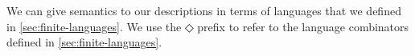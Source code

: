 We can give semantics to our descriptions in terms of languages that we defined in \cref{sec:finite-languages}. We use the ◇ prefix to refer to the language combinators defined in \cref{sec:finite-languages}.
%
\begin{code}%
%
\>[4]\AgdaSpace{}%
\AgdaSymbol{:}\AgdaSpace{}%
\AgdaSpace{}%
\AgdaSpace{}%
\AgdaSpace{}%
\AgdaSpace{}%
\<%
\\
%
\>[4]\AgdaSpace{}%
\AgdaSpace{}%
%
\>[22]\AgdaSymbol{\AgdaUnderscore{}}\AgdaSpace{}%
\AgdaSymbol{=}\AgdaSpace{}%
\<%
\\
%
\>[4]\AgdaSpace{}%
\AgdaSpace{}%
%
\>[22]\AgdaSymbol{\AgdaUnderscore{}}\AgdaSpace{}%
\AgdaSymbol{=}\AgdaSpace{}%
\<%
\\
%
\>[4]\AgdaSpace{}%
\AgdaSpace{}%
\AgdaSpace{}%
%
\>[22]\AgdaSymbol{\AgdaUnderscore{}}\AgdaSpace{}%
\AgdaSymbol{=}\AgdaSpace{}%
\AgdaSpace{}%
\<%
\\
%
\>[4]\AgdaSpace{}%
\AgdaSpace{}%
\AgdaSpace{}%
\AgdaSpace{}%
%
\>[22]\AgdaSpace{}%
\AgdaSymbol{=}\AgdaSpace{}%
\AgdaSpace{}%
\AgdaSpace{}%
\AgdaSpace{}%
\AgdaSpace{}%
\AgdaSpace{}%
\AgdaSpace{}%
\AgdaSpace{}%
\AgdaSpace{}%
\<%
\\
%
\>[4]\AgdaSpace{}%
\AgdaSpace{}%
\AgdaSpace{}%
\AgdaSpace{}%
%
\>[22]\AgdaSpace{}%
\AgdaSymbol{=}\AgdaSpace{}%
\AgdaSpace{}%
\AgdaSpace{}%
\AgdaSpace{}%
\AgdaSpace{}%
\AgdaSpace{}%
\AgdaSpace{}%
\AgdaSpace{}%

\end{code}
